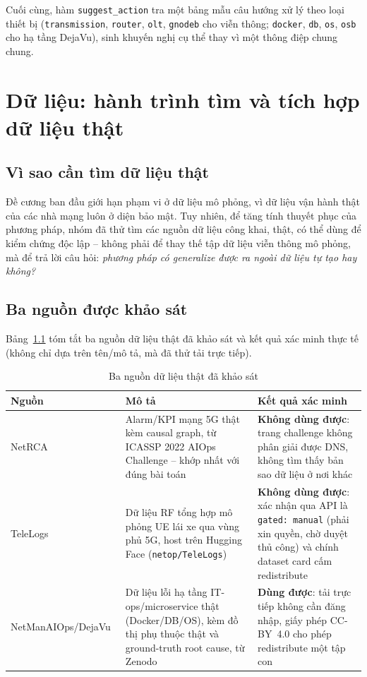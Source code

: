 \documentclass[12pt,a4paper]{report}
\newcommand{\code}[1]{\texttt{\small #1}}
\begin{document}
Cuối cùng, hàm \code{suggest\_action} tra một bảng mẫu câu hướng xử lý theo loại thiết bị
(\code{transmission}, \code{router}, \code{olt}, \code{gnodeb} cho viễn thông; \code{docker},
\code{db}, \code{os}, \code{osb} cho hạ tầng DejaVu), sinh khuyến nghị cụ thể thay vì một thông
điệp chung chung.

\chapter{Dữ liệu: hành trình tìm và tích hợp dữ liệu thật}
\label{ch:data}

\section{Vì sao cần tìm dữ liệu thật}

Đề cương ban đầu giới hạn phạm vi ở dữ liệu mô phỏng, vì dữ liệu vận hành thật của các nhà mạng
luôn ở diện bảo mật. Tuy nhiên, để tăng tính thuyết phục của phương pháp, nhóm đã thử tìm các
nguồn dữ liệu công khai, thật, có thể dùng để kiểm chứng độc lập -- không phải để thay thế tập dữ
liệu viễn thông mô phỏng, mà để trả lời câu hỏi: \emph{phương pháp có generalize được ra ngoài dữ
liệu tự tạo hay không?}

\section{Ba nguồn được khảo sát}

Bảng~\ref{tab:datasources} tóm tắt ba nguồn dữ liệu thật đã khảo sát và kết quả xác minh thực tế
(không chỉ dựa trên tên/mô tả, mà đã thử tải trực tiếp).

\begin{table}[H]
\centering
\caption{Ba nguồn dữ liệu thật đã khảo sát}
\label{tab:datasources}
\begin{tabular}{@{}p{2.4cm}p{5.6cm}p{4.2cm}@{}}
\toprule
\textbf{Nguồn} & \textbf{Mô tả} & \textbf{Kết quả xác minh} \\
\midrule
NetRCA~\cite{netrca2022} & Alarm/KPI mạng 5G thật kèm causal graph, từ ICASSP 2022 AIOps
Challenge -- khớp nhất với đúng bài toán & \textbf{Không dùng được}: trang challenge không phân
giải được DNS, không tìm thấy bản sao dữ liệu ở nơi khác \\[4pt]
TeleLogs~\cite{telelogs2025} & Dữ liệu RF tổng hợp mô phỏng UE lái xe qua vùng phủ 5G, host trên
Hugging Face (\texttt{netop/TeleLogs}) & \textbf{Không dùng được}: xác nhận qua API là
\texttt{gated: manual} (phải xin quyền, chờ duyệt thủ công) và chính dataset card cấm
redistribute \\[4pt]
NetManAIOps/DejaVu~\cite{dejavu2022} & Dữ liệu lỗi hạ tầng IT-ops/microservice thật (Docker/DB/OS),
kèm đồ thị phụ thuộc thật và ground-truth root cause, từ Zenodo & \textbf{Dùng được}: tải trực
tiếp không cần đăng nhập, giấy phép CC-BY~4.0 cho phép redistribute một tập con \\
\bottomrule
\end{tabular}
\end{table}
\end{document}
